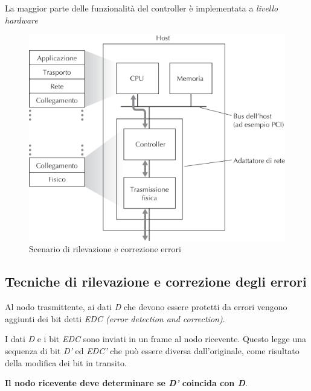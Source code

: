 \documentclass[12pt]{article}
\begin{document}
    La maggior parte delle funzionalità del controller è implementata a \textit{livello hardware}
    \begin{figure}[!htb]
        \centering
        \includegraphics[width=1\textwidth]{adattatore}
        \caption{Scenario di rilevazione e correzione errori}
    \end{figure}
    \FloatBarrier
    \subsection{Tecniche di rilevazione e correzione degli errori}               
            Al nodo trasmittente, ai dati \textit{D} che devono essere protetti da errori vengono aggiunti dei bit detti \textit{EDC (error detection and correction)}.
                            
            I dati \textit{D} e i bit \textit{EDC} sono inviati in un frame al nodo ricevente. Questo legge una sequenza di bit \textit{D'} ed \textit{EDC'} che può essere diversa dall'originale, come risultato della modifica dei bit in transito. 
                            
            \textbf{Il nodo ricevente deve determinare se \textit{D'} coincida con \textit{D}}.
            
\end{document}
